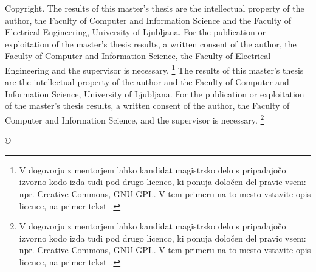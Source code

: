 \thispagestyle{empty}
\vspace*{\fill}
{\noindent\footnotesize
{\sc Copyright}. 
\ifPROGRAMMM
    The results of this master's thesis are the intellectual property of the author, the Faculty of Computer and Information Science and the Faculty of Electrical Engineering, University of Ljubljana. For the publication or exploitation of the master's thesis results, a written consent of the author, the Faculty of Computer and Information Science, the Faculty of Electrical Engineering and the supervisor is necessary.
    \footnote{V dogovorju z mentorjem lahko kandidat magistrsko delo s pripadajočo izvorno kodo izda tudi pod drugo licenco, ki ponuja določen del pravic vsem: npr. Creative Commons, GNU GPL. V tem primeru na to mesto vstavite opis licence, na primer tekst~\cite{licence}.}
\else
    The results of this master's thesis are the intellectual property of the author and the Faculty of Computer and Information Science, University of Ljubljana. For the publication or exploitation of the master's thesis results, a written consent of the author, the Faculty of Computer and Information Science, and the supervisor is necessary.
    \footnote{V dogovorju z mentorjem lahko kandidat magistrsko delo s pripadajočo izvorno kodo izda tudi pod drugo licenco, ki ponuja določen del pravic vsem: npr. Creative Commons, GNU GPL. V tem primeru na to mesto vstavite opis licence, na primer tekst~\cite{licence}.}
\fi    
}
\begin{center}
{\footnotesize{\sc \copyright \myyear\ \tauthor}}
\end{center} 